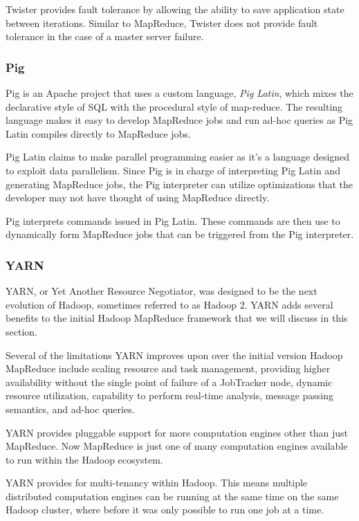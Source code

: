 \documentclass[]{article}
\begin{document}
Twister provides fault tolerance by allowing the ability to save application state between iterations. Similar to MapReduce, Twister does not provide fault tolerance in the case of a master server failure.

\subsubsection{Pig}
Pig\cite{olston2008pig} is an Apache project that uses a custom language, \textit{Pig Latin}, which mixes the declarative style of SQL with the procedural style of map-reduce. The resulting language makes it easy to develop MapReduce jobs and run ad-hoc queries as Pig Latin compiles directly to MapReduce jobs.

Pig Latin claims to make parallel programming easier as it's a language designed to exploit data parallelism. Since Pig is in charge of interpreting Pig Latin and generating MapReduce jobs, the Pig interpreter can utilize optimizations that the developer may not have thought of using MapReduce directly.

Pig interprets commands issued in Pig Latin. These commands are then use to dynamically form MapReduce jobs that can be triggered from the Pig interpreter.

\subsubsection{YARN}
YARN, or Yet Another Resource Negotiator\cite{vavilapalli2013apache}, was designed to be the next evolution of Hadoop, sometimes referred to as Hadoop 2. YARN adds several benefits to the initial Hadoop MapReduce framework that we will discuss in this section.

Several of the limitations YARN improves upon over the initial version Hadoop MapReduce include scaling resource and task management, providing higher availability without the single point of failure of a JobTracker node, dynamic resource utilization, capability to perform real-time analysis, message passing semantics, and ad-hoc queries.

YARN provides pluggable support for more computation engines other than just MapReduce. Now MapReduce is just one of many computation engines available to run within the Hadoop ecosystem.

YARN provides for multi-tenancy within Hadoop. This means multiple distributed computation engines can be running at the same time on the same Hadoop cluster, where before it was only possible to run one job at a time.
\end{document}
